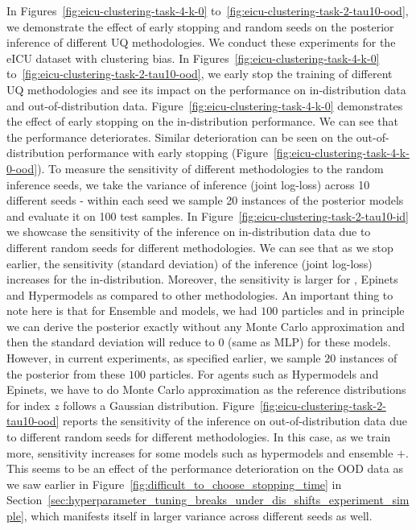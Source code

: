 In Figures~\ref{fig:eicu-clustering-task-4-k-0} to~\ref{fig:eicu-clustering-task-2-tau10-ood}, we demonstrate the effect of early stopping and random seeds on the posterior inference of different 
 UQ methodologies. 
 We conduct these experiments for the eICU dataset with clustering bias. 
 In Figures~\ref{fig:eicu-clustering-task-4-k-0} to~\ref{fig:eicu-clustering-task-2-tau10-ood}, 
 we   early stop the training of different UQ methodologies and see its impact on the performance on in-distribution data and out-of-distribution data. Figure~\ref{fig:eicu-clustering-task-4-k-0} demonstrates the effect of early stopping on the in-distribution performance. 
 We can see that the performance deteriorates. Similar deterioration can be seen on the out-of-distribution performance with early stopping (Figure~\ref{fig:eicu-clustering-task-4-k-0-ood}).
To measure the sensitivity of different methodologies to the random inference seeds, we take the variance of inference (joint log-loss) across 10 different seeds - within each seed we sample 20 instances of the posterior models and evaluate it on 100 test samples.
 In Figure~\ref{fig:eicu-clustering-task-2-tau10-id} we showcase the sensitivity of the inference on in-distribution data due to different random seeds for different methodologies. 
 We can see that as we stop earlier, the sensitivity (standard deviation) of the inference (joint log-loss) increases for the in-distribution. 
 Moreover, the sensitivity is larger for \ensembleplus, Epinets and Hypermodels as compared to other methodologies. 
 An important thing to note here is that for Ensemble and \ensembleplus models, we had $100$ particles and in principle we can derive the posterior exactly without any Monte Carlo approximation and then the standard deviation will reduce to 0 (same as MLP) for these models. However, in current experiments, as specified earlier, we sample $20$ instances of the posterior from these $100$ particles. For agents such as Hypermodels and Epinets, we have to do   Monte Carlo approximation as the reference distributions for index $z$ follows a Gaussian distribution.  
 Figure~\ref{fig:eicu-clustering-task-2-tau10-ood} reports the sensitivity of the inference on out-of-distribution data due to different random seeds for different methodologies. 
 In this case, as we train more, sensitivity increases for some models such as hypermodels and ensemble $+$.
 This seems to be an effect of the performance deterioration on the OOD data as we saw earlier in Figure~\ref{fig:difficult_to_choose_stopping_time} in Section~\ref{sec:hyperparameter_tuning_breaks_under_dis_shifts_experiment_simple},
 which manifests itself in larger variance across different seeds as well.

